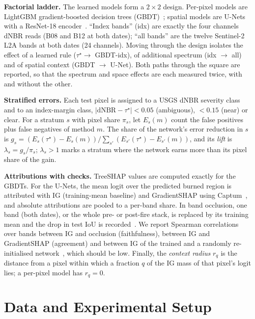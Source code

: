 \documentclass[conference]{IEEEtran}
\begin{document}
\textbf{Factorial ladder.} The learned models form a $2\times2$ design. Per-pixel models are LightGBM gradient-boosted decision trees (GBDT)~\cite{ke2017lightgbm}; spatial models are U-Nets with a ResNet-18 encoder~\cite{ronneberger2015unet,he2016resnet,iakubovskii2019smp}. ``Index bands'' (idx) are exactly the four channels dNBR reads (B08 and B12 at both dates); ``all bands'' are the twelve Sentinel-2 L2A bands at both dates (24 channels). Moving through the design isolates the effect of a learned rule ($\tau^{\star}\to$ GBDT-idx), of additional spectrum (idx $\to$ all) and of spatial context (GBDT $\to$ U-Net). Both paths through the square are reported, so that the spectrum and space effects are each measured twice, with and without the other.

\textbf{Stratified errors.} Each test pixel is assigned to a USGS dNBR severity class~\cite{key2006landscape} and to an index-margin class, $|\mathrm{dNBR}-\tau^{\star}|<0.05$ (ambiguous), $<0.15$ (near) or clear. For a stratum $s$ with pixel share $\pi_s$, let $E_s(m)$ count the false positives plus false negatives of method $m$. The share of the network's error reduction in $s$ is $g_s=(E_s(\tau^{\star})-E_s(m))/\sum_{s'}(E_{s'}(\tau^{\star})-E_{s'}(m))$, and its \emph{lift} is $\lambda_s=g_s/\pi_s$; $\lambda_s>1$ marks a stratum where the network earns more than its pixel share of the gain.

\textbf{Attributions with checks.} TreeSHAP values are computed exactly for the GBDTs. For the U-Nets, the mean logit over the predicted burned region is attributed with IG (training-mean baseline) and GradientSHAP using Captum~\cite{kokhlikyan2020captum}, and absolute attributions are pooled to a per-band share. In band occlusion, one band (both dates), or the whole pre- or post-fire stack, is replaced by its training mean and the drop in test IoU is recorded~\cite{petsiuk2018rise}. We report Spearman correlations over bands between IG and occlusion (faithfulness), between IG and GradientSHAP (agreement) and between IG of the trained and a randomly re-initialised network~\cite{adebayo2018sanity}, which should be low. Finally, the \emph{context radius} $r_q$ is the distance from a pixel within which a fraction $q$ of the IG mass of that pixel's logit lies; a per-pixel model has $r_q=0$.

\section{Data and Experimental Setup}\label{sec:setup}
\end{document}
